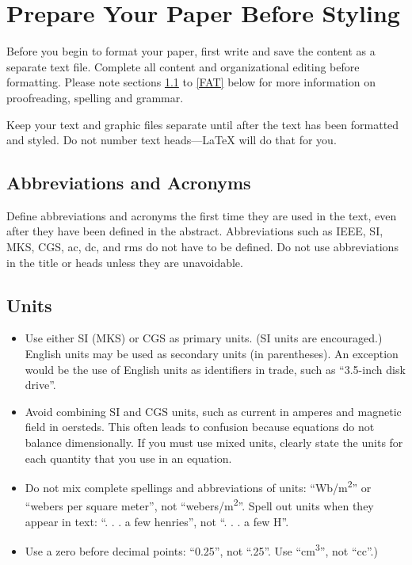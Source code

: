 \documentclass[conference]{IEEEtran}
\begin{document}
    \section{Prepare Your Paper Before Styling}
    Before you begin to format your paper, first write and save the content as a 
    separate text file. Complete all content and organizational editing before 
    formatting. Please note sections \ref{AA} to \ref{FAT} below for more information on 
    proofreading, spelling and grammar.

    Keep your text and graphic files separate until after the text has been 
    formatted and styled. Do not number text heads---{\LaTeX} will do that 
    for you.

    \subsection{Abbreviations and Acronyms}\label{AA}
    Define abbreviations and acronyms the first time they are used in the text, 
    even after they have been defined in the abstract. Abbreviations such as 
    IEEE, SI, MKS, CGS, ac, dc, and rms do not have to be defined. Do not use 
    abbreviations in the title or heads unless they are unavoidable.

    \subsection{Units}
    \begin{itemize}
    \item Use either SI (MKS) or CGS as primary units. (SI units are encouraged.) English units may be used as secondary units (in parentheses). An exception would be the use of English units as identifiers in trade, such as ``3.5-inch disk drive''.
    \item Avoid combining SI and CGS units, such as current in amperes and magnetic field in oersteds. This often leads to confusion because equations do not balance dimensionally. If you must use mixed units, clearly state the units for each quantity that you use in an equation.
    \item Do not mix complete spellings and abbreviations of units: ``Wb/m\textsuperscript{2}'' or ``webers per square meter'', not ``webers/m\textsuperscript{2}''. Spell out units when they appear in text: ``. . . a few henries'', not ``. . . a few H''.
    \item Use a zero before decimal points: ``0.25'', not ``.25''. Use ``cm\textsuperscript{3}'', not ``cc''.)
    \end{itemize}
\end{document}
